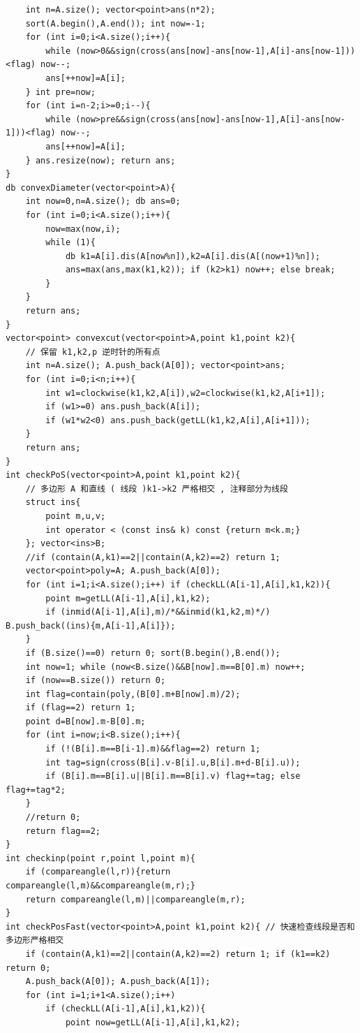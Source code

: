 \documentclass[twoside]{article}
\begin{document}
\begin{lstlisting}
    int n=A.size(); vector<point>ans(n*2); 
    sort(A.begin(),A.end()); int now=-1;
    for (int i=0;i<A.size();i++){
        while (now>0&&sign(cross(ans[now]-ans[now-1],A[i]-ans[now-1]))<flag) now--;
        ans[++now]=A[i];
    } int pre=now;
    for (int i=n-2;i>=0;i--){
        while (now>pre&&sign(cross(ans[now]-ans[now-1],A[i]-ans[now-1]))<flag) now--;
        ans[++now]=A[i];
    } ans.resize(now); return ans;
}
db convexDiameter(vector<point>A){
    int now=0,n=A.size(); db ans=0;
    for (int i=0;i<A.size();i++){
        now=max(now,i);
        while (1){
            db k1=A[i].dis(A[now%n]),k2=A[i].dis(A[(now+1)%n]);
            ans=max(ans,max(k1,k2)); if (k2>k1) now++; else break;
        }
    }
    return ans;
}
vector<point> convexcut(vector<point>A,point k1,point k2){
    // 保留 k1,k2,p 逆时针的所有点
    int n=A.size(); A.push_back(A[0]); vector<point>ans;
    for (int i=0;i<n;i++){
        int w1=clockwise(k1,k2,A[i]),w2=clockwise(k1,k2,A[i+1]);
        if (w1>=0) ans.push_back(A[i]);
        if (w1*w2<0) ans.push_back(getLL(k1,k2,A[i],A[i+1]));
    }
    return ans;
}
int checkPoS(vector<point>A,point k1,point k2){
    // 多边形 A 和直线 ( 线段 )k1->k2 严格相交 , 注释部分为线段
    struct ins{
        point m,u,v;
        int operator < (const ins& k) const {return m<k.m;}
    }; vector<ins>B;
    //if (contain(A,k1)==2||contain(A,k2)==2) return 1;
    vector<point>poly=A; A.push_back(A[0]); 
    for (int i=1;i<A.size();i++) if (checkLL(A[i-1],A[i],k1,k2)){
        point m=getLL(A[i-1],A[i],k1,k2); 
        if (inmid(A[i-1],A[i],m)/*&&inmid(k1,k2,m)*/) B.push_back((ins){m,A[i-1],A[i]});
    }
    if (B.size()==0) return 0; sort(B.begin(),B.end()); 
    int now=1; while (now<B.size()&&B[now].m==B[0].m) now++; 
    if (now==B.size()) return 0;
    int flag=contain(poly,(B[0].m+B[now].m)/2);
    if (flag==2) return 1;
    point d=B[now].m-B[0].m;
    for (int i=now;i<B.size();i++){
        if (!(B[i].m==B[i-1].m)&&flag==2) return 1;
        int tag=sign(cross(B[i].v-B[i].u,B[i].m+d-B[i].u));
        if (B[i].m==B[i].u||B[i].m==B[i].v) flag+=tag; else flag+=tag*2;
    }
    //return 0;
    return flag==2;
}
int checkinp(point r,point l,point m){
	if (compareangle(l,r)){return compareangle(l,m)&&compareangle(m,r);}
	return compareangle(l,m)||compareangle(m,r);
}
int checkPosFast(vector<point>A,point k1,point k2){ // 快速检查线段是否和多边形严格相交
	if (contain(A,k1)==2||contain(A,k2)==2) return 1; if (k1==k2) return 0;
	A.push_back(A[0]); A.push_back(A[1]);
	for (int i=1;i+1<A.size();i++)
		if (checkLL(A[i-1],A[i],k1,k2)){
			point now=getLL(A[i-1],A[i],k1,k2);

\end{lstlisting}
\end{document}
